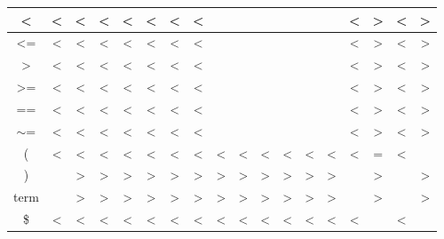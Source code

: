 \documentclass[11pt,a4paper]{article}
\begin{document}
\begin{table}[ht]
\begin{tabular}{|c|c|c|c|c|c|c|c|c|c|c|c|c|c|c|c|c|c|}
        \textless{} & \textless{} & \textless{} & \textless{} & \textless{} & \textless{} & \textless{} & \textless{} &  &  &  &  &  &  & \textless{} & \textgreater{} & \textless{} & \textgreater{} \\ \hline
        \textless{}= & \textless{} & \textless{} & \textless{} & \textless{} & \textless{} & \textless{} & \textless{} &  &  &  &  &  &  & \textless{} & \textgreater{} & \textless{} & \textgreater{} \\ \hline
        \textgreater{} & \textless{} & \textless{} & \textless{} & \textless{} & \textless{} & \textless{} & \textless{} &  &  &  &  &  &  & \textless{} & \textgreater{} & \textless{} & \textgreater{} \\ \hline
        \textgreater{}= & \textless{} & \textless{} & \textless{} & \textless{} & \textless{} & \textless{} & \textless{} &  &  &  &  &  &  & \textless{} & \textgreater{} & \textless{} & \textgreater{} \\ \hline
        == & \textless{} & \textless{} & \textless{} & \textless{} & \textless{} & \textless{} & \textless{} &  &  &  &  &  &  & \textless{} & \textgreater{} & \textless{} & \textgreater{} \\ \hline
        $\sim$= & \textless{} & \textless{} & \textless{} & \textless{} & \textless{} & \textless{} & \textless{} &  &  &  &  &  &  & \textless{} & \textgreater{} & \textless{} & \textgreater{} \\ \hline
        ( & \textless{} & \textless{} & \textless{} & \textless{} & \textless{} & \textless{} & \textless{} & \textless{} & \textless{} & \textless{} & \textless{} & \textless{} & \textless{} & \textless{} & = & \textless{} &  \\ \hline
        ) &  & \textgreater{} & \textgreater{} & \textgreater{} & \textgreater{} & \textgreater{} & \textgreater{} & \textgreater{} & \textgreater{} & \textgreater{} & \textgreater{} & \textgreater{} & \textgreater{} &  & \textgreater{} &  & \textgreater{} \\ \hline
        term &  & \textgreater{} & \textgreater{} & \textgreater{} & \textgreater{} & \textgreater{} & \textgreater{} & \textgreater{} & \textgreater{} & \textgreater{} & \textgreater{} & \textgreater{} & \textgreater{} &  & \textgreater{} &  & \textgreater{} \\ \hline
        \$ & \textless{} & \textless{} & \textless{} & \textless{} & \textless{} & \textless{} & \textless{} & \textless{} & \textless{} & \textless{} & \textless{} & \textless{} & \textless{} & \textless{} &  & \textless{} &  \\ \hline
        \end{tabular}
        \end{table}
    
\end{document}

